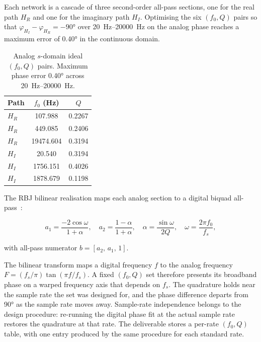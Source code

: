 \documentclass[11pt,a4paper]{article}
\begin{document}
Each network is a cascade of three second-order all-pass sections, one for the real path $H_R$ and one for the imaginary path $H_I$.
Optimising the six $(f_0, Q)$ pairs so that $\varphi_{H_I} - \varphi_{H_R} = -\ang{90}$ over \SIrange{20}{20000}{\hertz} on the analog phase reaches a maximum error of \ang{0.40} in the continuous domain.

\begin{table}[h]
\centering
\caption{Analog $s$-domain ideal $(f_0, Q)$ pairs. Maximum phase error \ang{0.40} across \SIrange{20}{20000}{\hertz}.}
\label{tab:analog-pairs}
\begin{tabular}{@{}lcc@{}}
\toprule
Path & $f_0$ (Hz) & $Q$ \\
\midrule
$H_R$ & 107.988  & 0.2267 \\
$H_R$ & 449.085  & 0.2406 \\
$H_R$ & 19474.604 & 0.3194 \\
\addlinespace
$H_I$ & 20.540   & 0.3194 \\
$H_I$ & 1756.151 & 0.4026 \\
$H_I$ & 1878.679 & 0.1198 \\
\bottomrule
\end{tabular}
\end{table}

The RBJ bilinear realisation maps each analog section to a digital biquad all-pass~\cite{RBJCookbook}:

\begin{equation}
a_1 = \frac{-2\cos\omega}{1+\alpha},\quad a_2 = \frac{1-\alpha}{1+\alpha},\quad
\alpha = \frac{\sin\omega}{2Q},\quad \omega = \frac{2\pi f_0}{f_s},
\end{equation}

with all-pass numerator $b = [a_2,\, a_1,\, 1]$.

The bilinear transform maps a digital frequency $f$ to the analog frequency $F = (f_s/\pi)\tan(\pi f / f_s)$.
A fixed $(f_0, Q)$ set therefore presents its broadband phase on a warped frequency axis that depends on $f_s$.
The quadrature holds near the sample rate the set was designed for, and the phase difference departs from \ang{90} as the sample rate moves away.
Sample-rate independence belongs to the design procedure: re-running the digital phase fit at the actual sample rate restores the quadrature at that rate.
The deliverable stores a per-rate $(f_0, Q)$ table, with one entry produced by the same procedure for each standard rate.
\end{document}
